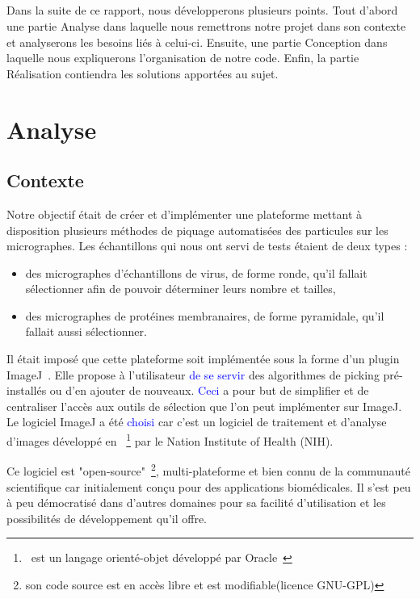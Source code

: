 \documentclass[11pt,a4paper]{report}
\begin{document}
\paragraph*{}
Dans la suite de ce rapport, nous développerons plusieurs points. Tout d'abord une partie Analyse dans laquelle nous remettrons notre projet dans son contexte et analyserons les besoins liés à celui-ci. Ensuite, une partie Conception dans laquelle nous expliquerons l'organisation de notre code. Enfin, la partie Réalisation contiendra les solutions apportées au sujet.

\chapter{Analyse}

\section{Contexte}
\noindent
Notre objectif était de créer et d'implémenter une plateforme mettant à disposition plusieurs méthodes de piquage automatisées des particules sur les micrographes. Les échantillons qui nous ont servi de tests étaient de deux types :%
\begin{itemize}
\item des micrographes d'échantillons de virus, de forme ronde, qu'il fallait sélectionner afin de pouvoir déterminer leurs nombre et tailles,
\item des micrographes de protéines membranaires, de forme pyramidale, qu'il fallait aussi sélectionner.\\
\end{itemize}
\noindent
Il était imposé que cette plateforme soit implémentée sous la forme d'un plugin ImageJ~\cite{imagej:url}. Elle propose à l'utilisateur \textcolor{blue}{de se servir} des algorithmes de picking pré-installés ou d'en ajouter de nouveaux. \textcolor{blue}{Ceci} a pour but de simplifier et de centraliser l'accès aux outils de sélection que l'on peut implémenter sur ImageJ.\\%

\noindent
Le logiciel ImageJ a été \textcolor{blue}{choisi} car c'est un logiciel de traitement et d'analyse d'images développé en \java~\footnote{\java\ est un langage orienté-objet développé par Oracle~\cite{java:url}} par le Nation Institute of Health (NIH).%

\noindent
Ce logiciel est "open-source"~\footnote{son code source est en accès libre et est modifiable(licence GNU-GPL)}, multi-plateforme et bien connu de la communauté scientifique car initialement conçu pour des applications biomédicales. Il s'est peu à peu démocratisé dans d'autres domaines pour sa facilité d'utilisation et les possibilités de développement qu'il offre.%
\end{document}

